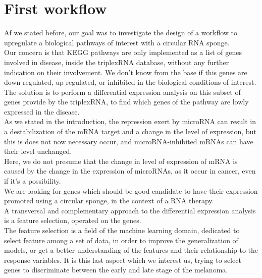 \documentclass[a4paper,12pt]{report}
\begin{document}
\section{First workflow}

Af we stated before, our goal was to investigate the design of a workflow to upregulate a biological pathways of interest with a circular RNA sponge.\\

Our concern is that KEGG pathways are only implemented as a list of genes involved in disease, inside the triplexRNA database\cite{triplex}, without any further indication on their involvement. We don't know from the base if this genes are down-regulated, up-regulated, or inhibited in the biological conditions of interest.\\

The solution is to perform a differential expression analysis on this subset of genes provide by the triplexRNA, to find which genes of the pathway are lowly expressed in the disease.\\

As we stated in the introduction, the repression exert by microRNA can result in a destabilization of the mRNA target and a change in the level of expression, but this is does not now necessary occur, and microRNA-inhibited mRNAs can have their level unchanged.\\

Here, we do not presume that the change in level of expression of mRNA is caused by the change in the expression of microRNAs, as it occur in cancer\cite{cancer}, even if it's a possibility. \\

We are looking for genes which should be good candidate to have their expression promoted using a circular sponge, in the context of a RNA therapy.\\

A transversal and complementary approach to the differential expression analysis is a feature selection, operated on the genes.\\

The feature selection is a field of the machine learning domain\cite{springer}, dedicated to select feature among a set of data, in order to improve the generalization of models, or get a better understanding of the features and their relationship to the response variables\cite{springer}. It is this last aspect which we interest us, trying to select genes to discriminate between the early and late stage of the melanoma.\\
\end{document}
